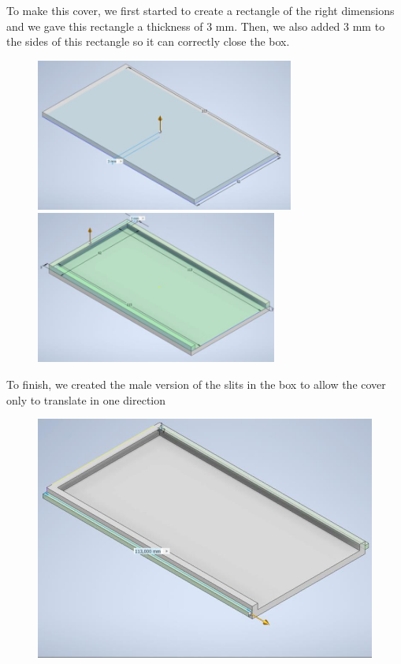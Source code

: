 To make this cover, we first started to create a rectangle of the right dimensions and we gave this rectangle a thickness of 3 mm. Then, we also added 3 mm to the sides of this rectangle so it can correctly close the box.
\begin{figure}[H]
    \includegraphics[height=5cm]{images/casing/img31.jpg}
    \hfill
    \includegraphics[height=5cm]{images/casing/img32.jpg}
\end{figure}

To finish, we created the male version of the slits in the box to allow the cover only to translate in one direction
\begin{figure}[H]
    \centering
    \includegraphics[width=.7\textwidth]{images/casing/img33.jpg}
\end{figure}

